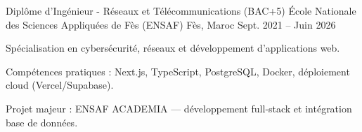 
\begin{cventries}

    \cventry
    {Diplôme d'Ingénieur - Réseaux et Télécommunications (BAC+5)} %
    {École Nationale des Sciences Appliquées de Fès (ENSAF)} %
    {Fès, Maroc} %
    {Sept. 2021 – Juin 2026} %
    {
        \begin{cvitems}
            \item {Spécialisation en cybersécurité, réseaux et développement d'applications web.}
            \item {Compétences pratiques : Next.js, TypeScript, PostgreSQL, Docker, déploiement cloud (Vercel/Supabase).}
            \item {Projet majeur : ENSAF ACADEMIA — développement full‑stack et intégration base de données.}
        \end{cvitems}
    }

\end{cventries}